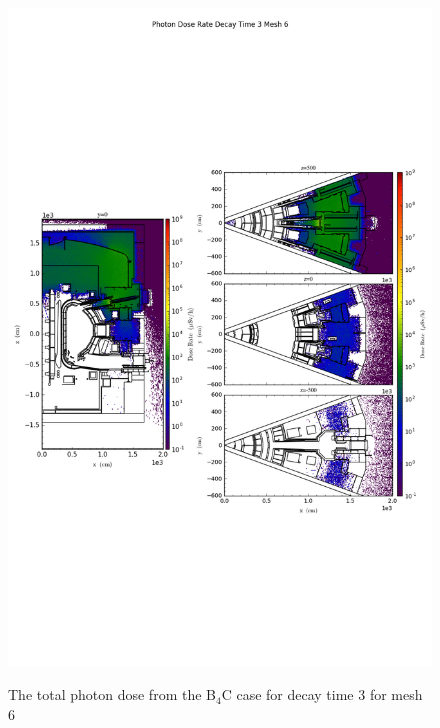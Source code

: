 \begin{figure}[ht!]
\centering
\includegraphics[trim={0cm 9cm 0cm 10cm},clip,scale=0.75]{../plots/final_model_nob4c/Photon_Dose_Rate_Decay_Time_3_Mesh_6.png}
\label{fig:photons_dc3_no4bc_m6_flux}
\caption{The total photon dose from the B$_4$C case for decay time 3 for mesh 6}
\end{figure}
